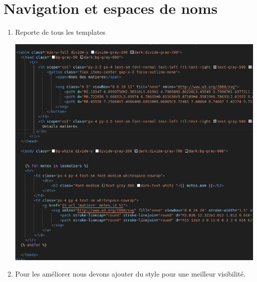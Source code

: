 \documentclass[10pt,a4paper]{article}
\begin{document}
\section{Navigation et espaces de noms}
\begin{enumerate}
\item Reporte de tous les templates\\
\begin{center}
\includegraphics[scale=0.4]{tab.png}
\end{center}

\item Pour les améliorer nous devons ajouter du style pour une meilleur visibilité.












\end{enumerate}
\end{document}
